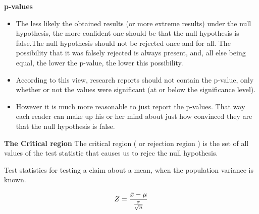 \documentclass[]{report}
\begin{document}
	
	
	
	\textbf{p-values}
	\begin{itemize}
		\item The less likely the obtained results (or more extreme results) under the null hypothesis, the more confident one should be that the null hypothesis is false.The null hypothesis should not be rejected once and for all. The possibility that it was falsely rejected is always present, and, all else being equal, the lower the p-value, the lower this possibility.
		\item According to this view, research reports should not contain the p-value, only whether or not the values were significant (at or below the significance level).
		\item
		However it is much more reasonable to just report the p-values. That way each reader can make up his or her mind about just how convinced they are that the null hypothesis is false.
	\end{itemize}
	
	
	
	
	{
		\textbf{The Critical region}
		The critical region ( or rejection region ) is the set of all values of the test statistic that causes us to rejec the null hypothesis.
		
	}
	{
		
		Test statistics for testing a claim about a mean, when the population variance is known.
		
		\[ Z = {\bar{x}  - \mu \over {\sigma \over \sqrt{n}}} \]
	}
	
	
	
	
\end{document}
